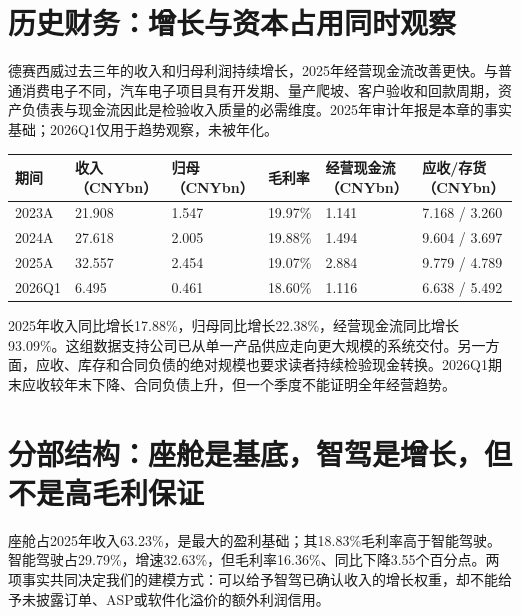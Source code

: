 \section{历史财务：增长与资本占用同时观察}

德赛西威过去三年的收入和归母利润持续增长，2025年经营现金流改善更快。与普通消费电子不同，汽车电子项目具有开发期、量产爬坡、客户验收和回款周期，资产负债表与现金流因此是检验收入质量的必需维度。2025年审计年报是本章的事实基础；2026Q1仅用于趋势观察，未被年化。

\begin{exhibitbox}[财务交付与营运资本]
\small
\begin{tabularx}{\textwidth}{L{2cm}Y Y Y Y Y}
\toprule
期间 & 收入（CNYbn） & 归母（CNYbn） & 毛利率 & 经营现金流（CNYbn） & 应收/存货（CNYbn） \\
\midrule
2023A & 21.908 & 1.547 & 19.97\% & 1.141 & 7.168 / 3.260 \\
2024A & 27.618 & 2.005 & 19.88\% & 1.494 & 9.604 / 3.697 \\
2025A & 32.557 & 2.454 & 19.07\% & 2.884 & 9.779 / 4.789 \\
2026Q1 & 6.495 & 0.461 & 18.60\% & 1.116 & 6.638 / 5.492 \\
\bottomrule
\end{tabularx}
\end{exhibitbox}

2025年收入同比增长17.88\%，归母同比增长22.38\%，经营现金流同比增长93.09\%。这组数据支持公司已从单一产品供应走向更大规模的系统交付。另一方面，应收、库存和合同负债的绝对规模也要求读者持续检验现金转换。2026Q1期末应收较年末下降、合同负债上升，但一个季度不能证明全年经营趋势。

\section{分部结构：座舱是基底，智驾是增长，但不是高毛利保证}

座舱占2025年收入63.23\%，是最大的盈利基础；其18.83\%毛利率高于智能驾驶。智能驾驶占29.79\%，增速32.63\%，但毛利率16.36\%、同比下降3.55个百分点。两项事实共同决定我们的建模方式：可以给予智驾已确认收入的增长权重，却不能给予未披露订单、ASP或软件化溢价的额外利润信用。

